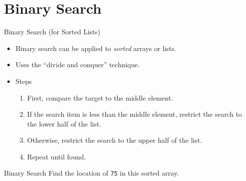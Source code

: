 \documentclass[14pt,aspectratio=1610]{beamer}
\begin{document}
\section{Binary Search}

\begin{frame}{Binary Search (for Sorted Lists)}
\begin{itemize}[<+->]
  \item
    Binary search can be applied to \emph{sorted} arrays or lists.
  \item
    Uses the ``divide and conquer'' technique.
  \item
    Steps
    \begin{enumerate}
      \item
        First, compare the target to the middle element.
      \item
        If the search item is less than the middle element, restrict the search to the lower half of the list.
      \item
        Otherwise, restrict the search to the upper half of the list.
      \item
        Repeat until found.
    \end{enumerate}
\end{itemize}
\end{frame}


\begin{frame}{Binary Search}
\center
Find the location of \texttt{75} in this sorted array.

\end{frame}
\end{document}
